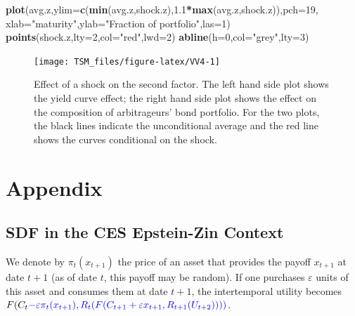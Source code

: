 \documentclass[
  12pt,
]{book}
\newenvironment{Shaded}{\begin{snugshade}}{\end{snugshade}}
\newcommand{\AttributeTok}[1]{\textcolor[rgb]{0.13,0.29,0.53}{#1}}
\newcommand{\DecValTok}[1]{\textcolor[rgb]{0.00,0.00,0.81}{#1}}
\newcommand{\FloatTok}[1]{\textcolor[rgb]{0.00,0.00,0.81}{#1}}
\newcommand{\FunctionTok}[1]{\textcolor[rgb]{0.13,0.29,0.53}{\textbf{#1}}}
\newcommand{\NormalTok}[1]{#1}
\newcommand{\SpecialCharTok}[1]{\textcolor[rgb]{0.81,0.36,0.00}{\textbf{#1}}}
\newcommand{\StringTok}[1]{\textcolor[rgb]{0.31,0.60,0.02}{#1}}
\theoremstyle{definition}
\theoremstyle{definition}
\theoremstyle{definition}
\theoremstyle{definition}
\theoremstyle{remark}
\begin{document}
\begin{Shaded}
\begin{Highlighting}[]
\FunctionTok{plot}\NormalTok{(avg.z,}\AttributeTok{ylim=}\FunctionTok{c}\NormalTok{(}\FunctionTok{min}\NormalTok{(avg.z,shock.z),}\FloatTok{1.1}\SpecialCharTok{*}\FunctionTok{max}\NormalTok{(avg.z,shock.z)),}\AttributeTok{pch=}\DecValTok{19}\NormalTok{,}
     \AttributeTok{xlab=}\StringTok{"maturity"}\NormalTok{,}\AttributeTok{ylab=}\StringTok{"Fraction of portfolio"}\NormalTok{,}\AttributeTok{las=}\DecValTok{1}\NormalTok{)}
\FunctionTok{points}\NormalTok{(shock.z,}\AttributeTok{lty=}\DecValTok{2}\NormalTok{,}\AttributeTok{col=}\StringTok{"red"}\NormalTok{,}\AttributeTok{lwd=}\DecValTok{2}\NormalTok{)}
\FunctionTok{abline}\NormalTok{(}\AttributeTok{h=}\DecValTok{0}\NormalTok{,}\AttributeTok{col=}\StringTok{"grey"}\NormalTok{,}\AttributeTok{lty=}\DecValTok{3}\NormalTok{)}
\end{Highlighting}
\end{Shaded}

\begin{figure}
\texttt{[image: TSM\_files/figure-latex/VV4-1]} \caption{Effect of a shock on the second factor. The left hand side plot shows the yield curve effect; the right hand side plot shows the effect on the composition of arbitrageurs' bond portfolio. For the two plots, the black lines indicate the unconditional average and the red line shows the curves conditional on the shock.}\label{fig:VV4}
\end{figure}

\hypertarget{appendix}{%
\section{Appendix}\label{appendix}}

\hypertarget{SDFEZ}{%
\subsection{SDF in the CES Epstein-Zin Context}\label{SDFEZ}}

We denote by \(\pi_t(x_{t+1})\) the price of an asset that provides the payoff \(x_{t+1}\) at date \(t+1\) (as of date \(t\), this payoff may be random). If one purchases \(\varepsilon\) units of this asset and consumes them at date \(t+1\), the intertemporal utility becomes \(F(C_t\color{blue}{ - \varepsilon \pi_t(x_{t+1})},R_t(F(C_{t+1}+\color{blue}{\varepsilon x_{t+1}},R_{t+1}(U_{t+2}))))\).
\end{document}
